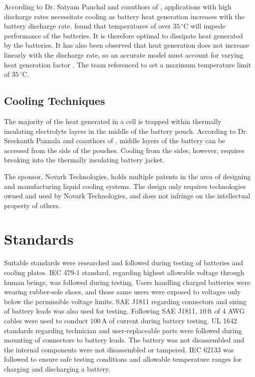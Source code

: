 \documentclass[11pt]{article}
\numberwithin{equation}{subsection} %
\newcommand{\degrees}{\ensuremath{^\circ}} %
\newcommand{\unit}[1]{\ensuremath{\, \mathrm{#1}}}             %
\begin{document}
According to Dr. Satyam Panchal and coauthors of \cite{heat_generation}, applications with high discharge rates necessitate cooling as battery heat generation increases with the battery discharge rate. \cite{heat_generation} found that temperatures of over $35\unit{\degrees C}$ will impede performance of the batteries. It is therefore optimal to dissipate heat generated by the batteries. It has also been observed that heat generation does not increase linearly with the discharge rate, so an accurate model must account for varying heat generation factor \cite{heat_generation}. The team referenced \cite{heat_generation} to set a maximum temperature limit of $35\unit{\degrees C}$.

\subsection{Cooling Techniques}
The majority of the heat generated in a cell is trapped within thermally insulating electrolyte layers in the middle of the battery pouch. According to Dr. Sreekanth Pannala and coauthors of \cite{side_cooling}, middle layers of the battery can be accessed from the side of the pouches. Cooling from the sides, however, requires breaking into the thermally insulating battery jacket.

The sponsor, Novark Technologies, holds multiple patents in the area of designing and manufacturing liquid cooling systems\cite{novark}. The design only requires technologies owned and used by Novark Technologies, and does not infringe on the intellectual property of others.

\section{Standards}
Suitable standards were researched and followed during testing of batteries and cooling plates. IEC 479-1 standard, regarding highest allowable voltage through human beings, was followed during testing. Users handling charged batteries were wearing rubber-sole shoes, and those same users were exposed to voltages only below the permissible voltage limits. SAE J1811 regarding connectors and sizing of battery leads was also used for testing. Following SAE J1811, $10\unit{ft}$ of 4 AWG cables were used to conduct $100\unit{A}$ of current during battery testing. UL 1642 standards regarding technician and user-replaceable parts were followed during mounting of connectors to battery leads. The battery was not disassembled and the internal components were not disassembled or tampered. IEC 62133 was followed to ensure safe testing conditions and allowable temperature ranges for charging and discharging a battery. 
\end{document}

